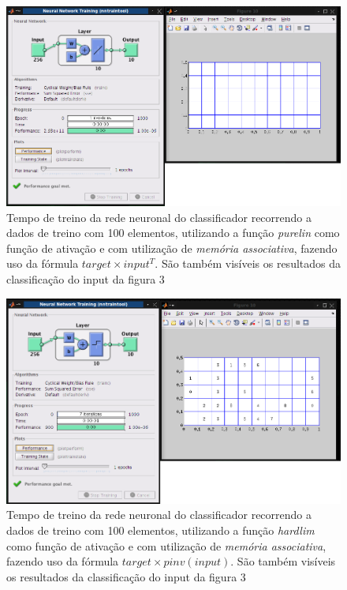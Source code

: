 \documentclass{article}
\begin{document}
\begin{figure}[h]
  \centering
      \includegraphics[scale=0.3]{100_Transpose_Linear.png}
  \caption{Tempo de treino da rede neuronal do classificador recorrendo a dados de treino com 100 elementos, utilizando a função \emph{purelin} como função de ativação e com utilização de \emph{memória associativa}, fazendo uso da fórmula $target\times input^T$. São também visíveis os resultados da classificação do input da figura 3}
\end{figure}

\begin{figure}[h]
  \centering
      \includegraphics[scale=0.3]{100_Pinv_Hardlim.png}
  \caption{Tempo de treino da rede neuronal do classificador recorrendo a dados de treino com 100 elementos, utilizando a função \emph{hardlim} como função de ativação e com utilização de \emph{memória associativa}, fazendo uso da fórmula $target\times pinv(input)$. São também visíveis os resultados da classificação do input da figura 3}
\end{figure}
\end{document}
